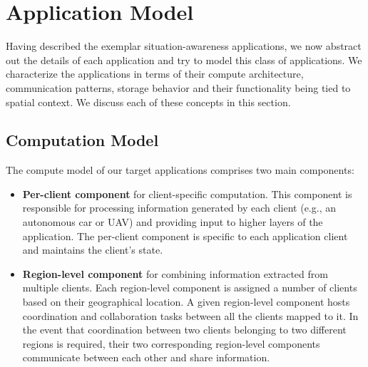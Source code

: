 \section{Application Model}
Having described the exemplar situation-awareness applications, we now abstract out the details of each application and try to model this class of applications. We characterize the applications in terms of their compute architecture, communication patterns, storage behavior and their functionality being tied to spatial context. We discuss each of these concepts in this section.

\subsection{Computation Model}
\label{sec:app_model_compute}
The compute model of our target applications comprises two main components:
\begin{itemize}
\item \textbf{Per-client component} for client-specific computation. This component is responsible for processing information generated by each client (e.g., an autonomous car or UAV) and providing input to higher layers of the application. The per-client component is specific to each application client and maintains the client's state.
\item \textbf{Region-level component} for combining information extracted from multiple clients. Each region-level component is assigned a number of clients based on their geographical location. A given region-level component hosts  coordination and collaboration tasks between all the clients mapped to it. In the event that coordination between two clients belonging to two different regions is required, their two corresponding region-level components communicate between each other and share information.
\end{itemize}
